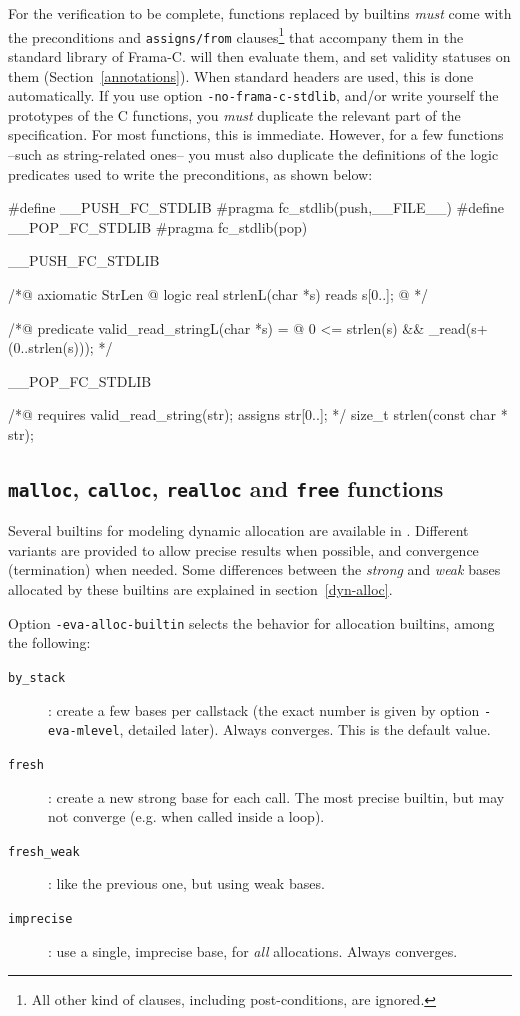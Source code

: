 \documentclass{frama-c-book}
\begin{document}
For the verification to be complete, functions replaced by builtins
\emph{must} come with the preconditions and \lstinline+assigns/from+
clauses\footnote{All other kind of clauses, including post-conditions,
  are ignored.}  that accompany them in the standard library of
Frama-C. \Eva{} will then evaluate them, and set validity statuses on
them (Section~\ref{annotations}).
%
When standard headers are used, this is done automatically. If you use
option \lstinline|-no-frama-c-stdlib|, and/or write yourself the
prototypes of the C functions, you \emph{must} duplicate the relevant
part of the specification. For most functions, this is
immediate. However, for a few functions --such as string-related
ones-- you must also duplicate the definitions of the logic predicates
used to write the preconditions, as shown below:
%
\begin{listing-nonumber}
#define __PUSH_FC_STDLIB #pragma fc_stdlib(push,__FILE__)
#define __POP_FC_STDLIB #pragma fc_stdlib(pop)

__PUSH_FC_STDLIB

/*@ axiomatic StrLen {
  @ logic real strlen{L}(char *s) reads s[0..];
  @ }
*/

/*@ predicate valid_read_string{L}(char *s) =
  @   0 <= strlen(s) && \valid_read(s+(0..strlen(s)));
*/

__POP_FC_STDLIB

/*@ requires valid_read_string(str);
    assigns \result \from str[0..]; */
size_t strlen(const char * str);
\end{listing-nonumber}


\subsection{{\tt malloc}, {\tt calloc}, {\tt realloc} and {\tt free} functions}
\label{malloc}

Several builtins for modeling dynamic allocation are available in \FramaC.
Different variants are provided to allow precise results when possible,
and convergence (termination) when needed. Some differences between the
\emph{strong} and \emph{weak} bases allocated by these builtins are
explained in section~\ref{dyn-alloc}.

Option \lstinline|-eva-alloc-builtin| selects the behavior for allocation
builtins, among the following:

\begin{description}
\item[\texttt{by\_stack}]: create a few bases per callstack (the exact number
  is given by option \lstinline|-eva-mlevel|, detailed later).
  Always converges. This is the default value.
\item[\texttt{fresh}]: create a new strong base for each call. The most
  precise builtin, but may not converge (e.g. when called inside a loop).
\item[\texttt{fresh\_weak}]: like the previous one, but using weak bases.
\item[\texttt{imprecise}]: use a single, imprecise base, for {\em all}
  allocations. Always converges.
\end{description}
\end{document}
